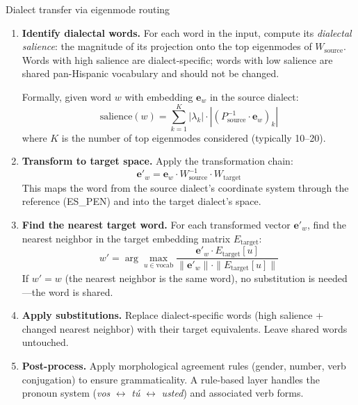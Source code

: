 \documentclass[11pt,a4paper]{article}
\begin{document}
\begin{howbox}{Dialect transfer via eigenmode routing}
\begin{enumerate}
  \item \textbf{Identify dialectal words.} For each word in the input,
    compute its \emph{dialectal salience}: the magnitude of its
    projection onto the top eigenmodes of $W_{\text{source}}$. Words
    with high salience are dialect-specific; words with low salience
    are shared pan-Hispanic vocabulary and should not be changed.

    Formally, given word $w$ with embedding $\mathbf{e}_w$ in the
    source dialect:
    \[
    \text{salience}(w) = \sum_{k=1}^{K}
    |\lambda_k| \cdot |(P^{-1}_{\text{source}} \cdot \mathbf{e}_w)_k|
    \]
    where $K$ is the number of top eigenmodes considered (typically
    10--20).

  \item \textbf{Transform to target space.} Apply the transformation
    chain:
    \[
    \mathbf{e}'_w = \mathbf{e}_w \cdot W_{\text{source}}^{-1}
                                  \cdot W_{\text{target}}
    \]
    This maps the word from the source dialect's coordinate system
    through the reference (ES\_PEN) and into the target dialect's
    space.

  \item \textbf{Find the nearest target word.} For each transformed
    vector $\mathbf{e}'_w$, find the nearest neighbor in the target
    embedding matrix $E_{\text{target}}$:
    \[
    w' = \arg\max_{u \in \text{vocab}}
    \frac{\mathbf{e}'_w \cdot E_{\text{target}}[u]}
         {\|\mathbf{e}'_w\| \cdot \|E_{\text{target}}[u]\|}
    \]
    If $w' = w$ (the nearest neighbor is the same word), no
    substitution is needed---the word is shared.

  \item \textbf{Apply substitutions.} Replace dialect-specific words
    (high salience + changed nearest neighbor) with their target
    equivalents. Leave shared words untouched.

  \item \textbf{Post-process.} Apply morphological agreement rules
    (gender, number, verb conjugation) to ensure grammaticality.
    A rule-based layer handles the pronoun system (\emph{vos}
    $\leftrightarrow$ \emph{t\'u} $\leftrightarrow$ \emph{usted})
    and associated verb forms.
\end{enumerate}
\end{howbox}
\end{document}
